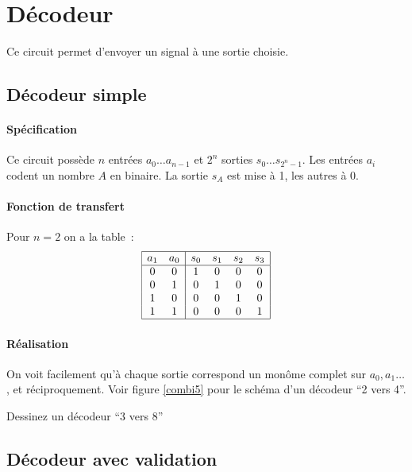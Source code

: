 \section{D\'ecodeur}

Ce circuit permet d'envoyer un signal \`a une sortie choisie.

\subsection{D\'ecodeur simple}

\paragraph{Sp\'ecification}
Ce circuit poss\`ede $n$ entr\'ees $a_0 \ldots a_{n-1}$ et $2^n$ sorties
$s_0 \ldots s_{{2^n}-1}$.  Les entr\'ees $a_i$ codent un nombre $A$ en
binaire. La sortie $s_A$ est mise \`a 1, les autres \`a 0.

\paragraph{Fonction de transfert} Pour $n=2$ on a la table~:
$$ \begin{array}{|cc|cccc|}
\hline
a_1 & a_0 & s_0 & s_1 & s_2 & s_3 \\
\hline
0 & 0 & 1 & 0 & 0 & 0 \\
0 & 1 & 0 & 1 & 0 & 0 \\
1 & 0 & 0 & 0 & 1 & 0 \\
1 & 1 & 0 & 0 & 0 & 1 \\
\hline
\end{array} $$

\paragraph{R\'ealisation}
On voit facilement qu'\`a chaque sortie correspond un mon\^ome complet
sur $a_0,a_1\ldots$, et r\'eciproquement. Voir figure \ref{combi5} pour
le sch\'ema d'un d\'ecodeur ``2 vers 4''.


\begin{exercice}{Dessinez un d\'ecodeur ``3 vers 8''}
\end{exercice}

\subsection{D\'ecodeur avec validation }

